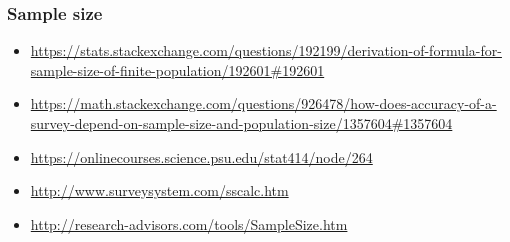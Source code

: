 \subsubsection{Sample size}
\begin{itemize}
\item \url{https://stats.stackexchange.com/questions/192199/derivation-of-formula-for-sample-size-of-finite-population/192601#192601}
\item \url{https://math.stackexchange.com/questions/926478/how-does-accuracy-of-a-survey-depend-on-sample-size-and-population-size/1357604#1357604}
\item \url{https://onlinecourses.science.psu.edu/stat414/node/264}
\item \url{http://www.surveysystem.com/sscalc.htm}
\item \url{http://research-advisors.com/tools/SampleSize.htm}
\end{itemize}



